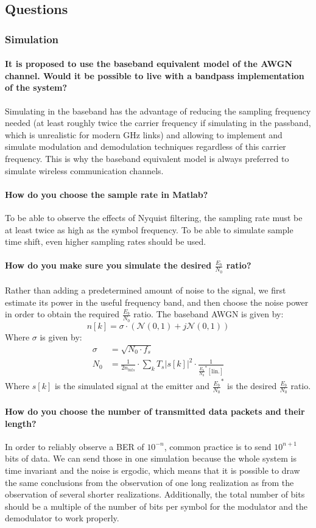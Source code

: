 \subsection{Questions}
\subsubsection{Simulation}
\paragraph{It is proposed to use the baseband equivalent model of the AWGN channel. Would it be
possible to live with a bandpass implementation of the system?}
Simulating in the baseband has the advantage of reducing the sampling frequency needed (at least roughly twice the carrier frequency if simulating in the passband, which is unrealistic for modern \si{\giga\hertz} links) and allowing to implement and simulate modulation and demodulation techniques regardless of this carrier frequency.
This is why the baseband equivalent model is always preferred to simulate wireless communication channels.
\paragraph{How do you choose the sample rate in Matlab?}
To be able to observe the effects of Nyquist filtering, the sampling rate must be at least twice as high as the symbol frequency. To be able to simulate sample time shift, even higher sampling rates should be used.
\paragraph{How do you make sure you simulate the desired $\frac{E_b}{N_0}$ ratio?}
Rather than adding a predetermined amount of noise to the signal, we first estimate its power in the useful frequency band, and then choose the noise power in order to obtain the required $\frac{E_b}{N_0}$ ratio.
The baseband AWGN is given by:
\[
n[k] = \sigma \cdot \left ( \mathcal{N}(0,1) + j \mathcal{N}(0,1) \right )
\]
Where $\sigma$ is given by:
\begin{align*}
\sigma &= \sqrt{N_0\cdot f_s}\\
N_0 &= \frac{1}{2n_{bits}}\cdot \sum_k{T_s{\big | s[k]\big |}^2} \cdot \frac{1}{\tfrac{E_b}{N_0}^*[\mathrm{lin.}]}
\end{align*}
Where $s[k]$ is the simulated signal at the emitter and $\frac{E_b}{N_0}^*$ is the desired $\frac{E_b}{N_0}$ ratio.
\paragraph{How do you choose the number of transmitted data packets and their length?}
In order to reliably observe a BER of $10^{-n}$, common practice is to send $10^{n+1}$ bits of data. We can send those in one simulation because the whole system is time invariant and the noise is ergodic, which means that it is possible to draw the same conclusions from the observation of one long realization as from the observation of several shorter realizations.
Additionally, the total number of bits should be a multiple of the number of bits per symbol for the modulator and the demodulator to work properly.

